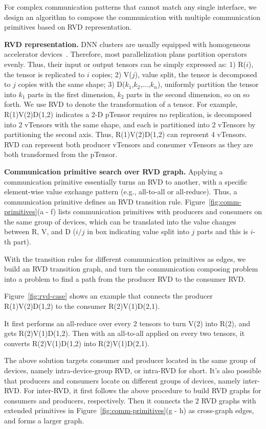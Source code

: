 For complex communication patterns that cannot match any single interface, we design an algorithm to compose the communication with multiple communication primitives based on RVD representation.

{\bf  RVD representation. } DNN clusters are usually equipped with homogeneous accelerator devices~\cite{hived}. Therefore, most parallelization plans partition operators evenly. Thus, their input or output tensors can be simply expressed as: 1)  R($i$), the tensor is replicated to $i$ copies; 2) V($j$), value split, the tensor is decomposed to $j$ copies with the same shape; 3) D($k_1$,$k_2$,...,$k_n$), uniformly partition the tensor into $k_1$ parts in the first dimension, $k_2$ parts in the second dimension, so on so forth. We use RVD to denote the transformation of a tensor. For example, R(1)V(2)D(1,2) indicates a 2-D pTensor requires no replication, is decomposed into 2 vTensors with the same shape, and each is partitioned into 2 vTensors by partitioning the second axis. Thus, R(1)V(2)D(1,2) can represent 4 vTensors. RVD can represent both producer vTensors and consumer vTensors as they are both transformed from the pTensor.

{\bf  Communication primitive search over RVD graph. } Applying a communication primitive essentially turns an RVD to another, with a specific element-wise value exchange pattern (e.g., all-to-all or all-reduce). Thus, a communication primitive defines an RVD transition rule. 
Figure~\ref{fig:comm-primitives}(a - f) lists communication primitives with producers and consumers on the same group of devices, which can be translated into the value changes between R, V, and D ($i / j$ in box indicating value split into $j$ parts and this is $i$-th part).

With the transition rules for different communication primitives as edges, we build an RVD transition graph, and turn the communication composing problem into a problem to find a path from the producer RVD to the consumer RVD.

Figure~\ref{fig:rvd-case} shows an example that connects the producer R(1)V(2)D(1,2) to the consumer R(2)V(1)D(2,1).

It first performs an all-reduce over every 2 tensors to turn V(2) into R(2), and gets R(2)V(1)D(1,2). Then with an all-to-all applied on every two tensors, it converts R(2)V(1)D(1,2) into R(2)V(1)D(2,1).

The above solution targets consumer and producer located in the same group of devices, namely intra-device-group RVD, or intra-RVD for short. It's also possible that producers and consumers locate on different groups of devices, namely inter-RVD. For inter-RVD, it first follows the above procedure to build RVD graphs for consumers and producers, respectively. Then it connects the 2 RVD graphs with extended primitives in Figure~\ref{fig:comm-primitives}(g - h) as cross-graph edges, and forms a larger graph.

